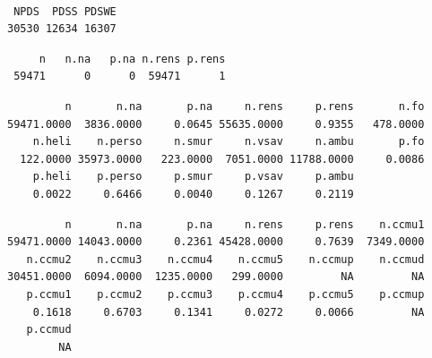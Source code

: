 \documentclass[]{article}
\newenvironment{Shaded}{\begin{snugshade}}{\end{snugshade}}
\newcommand{\KeywordTok}[1]{\textcolor[rgb]{0.13,0.29,0.53}{\textbf{{#1}}}}
\newcommand{\CommentTok}[1]{\textcolor[rgb]{0.56,0.35,0.01}{\textit{{#1}}}}
\newcommand{\NormalTok}[1]{{#1}}
\begin{document}
\begin{verbatim}

 NPDS  PDSS PDSWE 
30530 12634 16307 
\end{verbatim}

\begin{Shaded}
\end{Shaded}

\begin{verbatim}
     n   n.na   p.na n.rens p.rens 
 59471      0      0  59471      1 
\end{verbatim}

\begin{Shaded}
\end{Shaded}

\begin{verbatim}
         n       n.na       p.na     n.rens     p.rens       n.fo 
59471.0000  3836.0000     0.0645 55635.0000     0.9355   478.0000 
    n.heli    n.perso     n.smur     n.vsav     n.ambu       p.fo 
  122.0000 35973.0000   223.0000  7051.0000 11788.0000     0.0086 
    p.heli    p.perso     p.smur     p.vsav     p.ambu 
    0.0022     0.6466     0.0040     0.1267     0.2119 
\end{verbatim}

\begin{Shaded}
\end{Shaded}

\begin{verbatim}
         n       n.na       p.na     n.rens     p.rens    n.ccmu1 
59471.0000 14043.0000     0.2361 45428.0000     0.7639  7349.0000 
   n.ccmu2    n.ccmu3    n.ccmu4    n.ccmu5    n.ccmup    n.ccmud 
30451.0000  6094.0000  1235.0000   299.0000         NA         NA 
   p.ccmu1    p.ccmu2    p.ccmu3    p.ccmu4    p.ccmu5    p.ccmup 
    0.1618     0.6703     0.1341     0.0272     0.0066         NA 
   p.ccmud 
        NA 
\end{verbatim}
\end{document}
